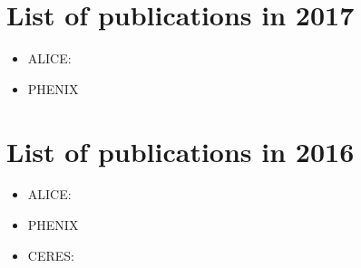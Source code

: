 \documentclass[12pt]{article}
\begin{document}
\clearpage



\section{List of publications in 2017}

\begin{itemize}
\item ALICE:
\cite{
Acharya:2017zfg,
Adam:2017ucq,
Adamova:2017opl,
Acharya:2017hdv,
Acharya:2017hyu,
Acharya:2017jgo,
Acharya:2017hjh,
Adam:2017zbf,
Adamova:2017elh,
Adam:2016iwf,
Adam:2016ddh,
Alice:2016wka,
Adam:2016ilk,
Adam:2016khe,
Adam:2016ckp,
Adam:2016tsv,
Adam:2016wyz,
Adam:2016rdg,
ALICE:2017jyt,
ALICE:2016clc,
Adam:2015gka,
Adam:2015jca,
Adam:2015nna}

\item PHENIX
\cite{
Aidala:2017pum,
Adare:2017caq,
Aidala:2017iad,
Adare:2016jta,
Adare:2016psx,
Adare:2016bug}

\end{itemize}


\section{List of publications in 2016}

\begin{itemize}
\item ALICE:
\cite{
Adam:2016ssk,
Adam:2016ich,
ALICE:2016kpq,
Adam:2016jfp,
Adam:2016ohd,
Adam:2016mkz,
Adam:2016acv,
Adam:2016izf,
Adam:2016bpr,
Adam:2016dau,
Adam:2015pbc,
Adam:2015vsf,
Adam:2015ptt,
Adam:2015vje,
Adam:2015gba,
Adam:2015pza,
Adam:2015rta,
Adam:2015qda,
Adam:2015mda,
Adam:2015lda,
Adam:2015kda,
Adam:2015jda,
Adam:2015gda,
Adam:2015sza,
ALICE:2015wfa,
Adam:2015vna,
Adam:2015eta,
Adam:2015pga,
Adam:2015vda,
Adam:2015isa,
Adam:2015yta,
Adam:2015bka,
Adam:2015nca,
Adam:2015kca}


\item PHENIX
\cite{
Adare:2016cqe,
Adare:2015ozj,
Adare:2015cpn,
Adare:2015lcd,
Adare:2015cua,
Adare:2015bua,
Adare:2015ema,
Adare:2015hva,
Adare:2015ila,
Adare:2015hla,
Adare:2015gla,
Adare:2015aqk,
Adare:2015gsd,
Adare:2014kci}

\item CERES:
\cite{Milosevic:2016kpl}

\end{itemize}
\end{document}
